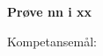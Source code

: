 
\centerline\textbf{Prøve nn  i xx }  \bigskip

Kompetansemål:
\begin{itemize}[noitemsep]
\end{itemize}

